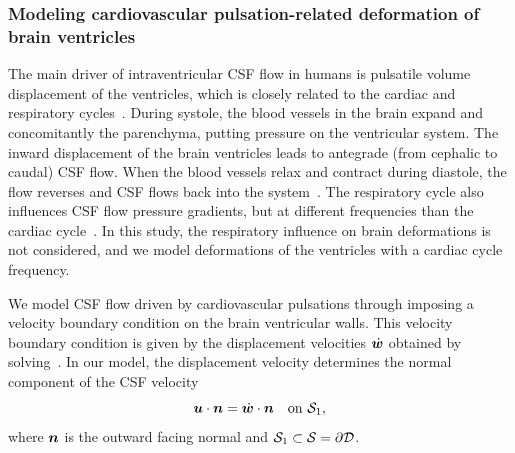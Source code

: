 \documentclass{template}
\begin{document}
\subsubsection{Modeling cardiovascular pulsation-related deformation of brain ventricles}
\label{subsubsec:deformation}
The main driver of intraventricular CSF flow in humans is pulsatile volume displacement
of the ventricles, which is closely related to the cardiac and respiratory cycles~\citep{wagshul2011pulsating,
Vinje2019RespiratoryMeasurements, sweetman2011cerebrospinal, baledent2001cerebrospinal, Neumaier2025}. 
During systole, the blood vessels in the brain expand and concomitantly
the parenchyma, putting pressure on the ventricular system. The inward displacement
of the brain ventricles leads to antegrade (from cephalic to caudal) CSF flow.
When the blood vessels relax and contract during diastole, the flow reverses and
CSF flows back into the system~\citep{sweetman2011cerebrospinal, greitz1992pulsatile}.
The respiratory cycle also influences CSF flow pressure 
gradients, but at different frequencies
than the cardiac cycle~\citep{Vinje2019RespiratoryMeasurements}.
In this study, the respiratory influence on brain deformations is not considered,
and we model deformations of the ventricles with a cardiac cycle frequency.

We model CSF flow driven by cardiovascular pulsations
through imposing a velocity boundary condition on the
brain ventricular walls. This velocity boundary condition
is given by the displacement velocities $\dot{\bm{w}}$ obtained 
by solving~.
In our model, the displacement velocity determines the normal component
of the CSF velocity
\begin{equation}
    \bm{u}\cdot\bm{n} = \dot{\bm{w}}\cdot\bm{n} \quad\text{on }\mathcal{S}_1,
\end{equation}
where $\bm{n}$ is the outward facing normal and 
$\mathcal{S}_1\subset\mathcal{S} = \partial\mathcal{D}$.
\end{document}
